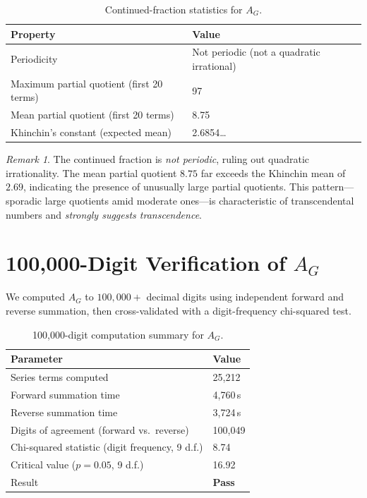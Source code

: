 \documentclass[11pt,a4paper]{article}
\theoremstyle{definition}
\theoremstyle{remark}
\newtheorem{remark}[theorem]{Remark}
\newcommand{\AG}{A_G}
\begin{document}
\begin{table}[h]
\centering
\begin{tabular}{ll}
\toprule
\textbf{Property} & \textbf{Value} \\
\midrule
Periodicity & Not periodic (not a quadratic irrational) \\
Maximum partial quotient (first 20 terms) & 97 \\
Mean partial quotient (first 20 terms) & 8.75 \\
Khinchin's constant (expected mean) & 2.6854\ldots \\
\bottomrule
\end{tabular}
\caption{Continued-fraction statistics for $\AG$.}
\label{tab:cfrac}
\end{table}

\begin{remark}
The continued fraction is \emph{not periodic}, ruling out quadratic irrationality. The mean partial quotient $8.75$ far exceeds the Khinchin mean of $2.69$, indicating the presence of unusually large partial quotients. This pattern---sporadic large quotients amid moderate ones---is characteristic of transcendental numbers and \emph{strongly suggests transcendence}.
\end{remark}

\section{100{,}000-Digit Verification of \texorpdfstring{$\AG$}{A\_G}}\label{sec:100k}

We computed $\AG$ to $100{,}000+$ decimal digits using independent forward and reverse summation, then cross-validated with a digit-frequency chi-squared test.

\begin{table}[h]
\centering
\begin{tabular}{ll}
\toprule
\textbf{Parameter} & \textbf{Value} \\
\midrule
Series terms computed & 25{,}212 \\
Forward summation time & 4{,}760\,s \\
Reverse summation time & 3{,}724\,s \\
Digits of agreement (forward vs.\ reverse) & 100{,}049 \\
Chi-squared statistic (digit frequency, 9 d.f.) & 8.74 \\
Critical value ($p = 0.05$, 9 d.f.) & 16.92 \\
Result & \textbf{Pass} \\
\bottomrule
\end{tabular}
\caption{100{,}000-digit computation summary for $\AG$.}
\label{tab:100k}
\end{table}
\end{document}
